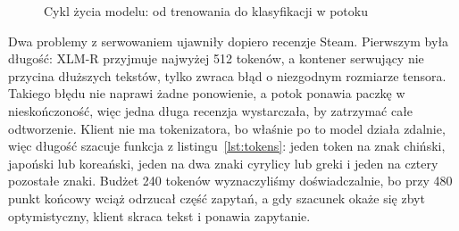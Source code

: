\begin{figure}[hbp]
  \centering
  \caption{Cykl życia modelu: od trenowania do klasyfikacji w potoku}
  \label{fig:model-lifecycle}
\end{figure}

Dwa problemy z serwowaniem ujawniły dopiero recenzje Steam.
Pierwszym była długość: XLM-R przyjmuje najwyżej 512 tokenów, a kontener serwujący nie przycina dłuższych tekstów, tylko zwraca błąd o niezgodnym rozmiarze tensora.
Takiego błędu nie naprawi żadne ponowienie, a potok ponawia paczkę w nieskończoność, więc jedna długa recenzja wystarczała, by zatrzymać całe odtworzenie.
Klient nie ma tokenizatora, bo właśnie po to model działa zdalnie, więc długość szacuje funkcja z listingu~\ref{lst:tokens}: jeden token na znak chiński, japoński lub koreański, jeden na dwa znaki cyrylicy lub greki i jeden na cztery pozostałe znaki.
Budżet 240 tokenów wyznaczyliśmy doświadczalnie, bo przy 480 punkt końcowy wciąż odrzucał część zapytań, a gdy szacunek okaże się zbyt optymistyczny, klient skraca tekst i ponawia zapytanie.

